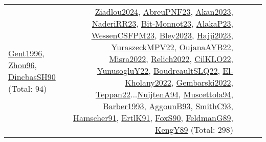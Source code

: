 {\begin{longtable}{p{3cm}r>{\raggedright\arraybackslash}p{6cm}>{\raggedright\arraybackslash}p{6cm}>{\raggedright\arraybackslash}p{8cm}}
\hyperref[detail:Gent1996]{Gent1996}, \hyperref[detail:Zhou96]{Zhou96}, \hyperref[detail:DincbasSH90]{DincbasSH90} (Total: 94) & \hyperref[detail:Ziadlou2024]{Ziadlou2024}, \hyperref[detail:AbreuPNF23]{AbreuPNF23}, \hyperref[detail:Akan2023]{Akan2023}, \hyperref[detail:NaderiRR23]{NaderiRR23}, \hyperref[detail:Bit-Monnot23]{Bit-Monnot23}, \hyperref[detail:AlakaP23]{AlakaP23}, \hyperref[detail:WessenCSFPM23]{WessenCSFPM23}, \hyperref[detail:Bley2023]{Bley2023}, \hyperref[detail:Hajji2023]{Hajji2023}, \hyperref[detail:YuraszeckMPV22]{YuraszeckMPV22}, \hyperref[detail:OujanaAYB22]{OujanaAYB22}, \hyperref[detail:Misra2022]{Misra2022}, \hyperref[detail:Relich2022]{Relich2022}, \hyperref[detail:CilKLO22]{CilKLO22}, \hyperref[detail:YunusogluY22]{YunusogluY22}, \hyperref[detail:BoudreaultSLQ22]{BoudreaultSLQ22}, \hyperref[detail:El-Kholany2022]{El-Kholany2022}, \hyperref[detail:Gembarski2022]{Gembarski2022}, \hyperref[detail:Teppan22]{Teppan22}...\hyperref[detail:NuijtenA94]{NuijtenA94}, \hyperref[detail:Muscettola94]{Muscettola94}, \hyperref[detail:Barber1993]{Barber1993}, \hyperref[detail:AggounB93]{AggounB93}, \hyperref[detail:SmithC93]{SmithC93}, \hyperref[detail:Hamscher91]{Hamscher91}, \hyperref[detail:ErtlK91]{ErtlK91}, \hyperref[detail:FoxS90]{FoxS90}, \hyperref[detail:FeldmanG89]{FeldmanG89}, \hyperref[detail:KengY89]{KengY89} (Total: 298)\\

\end{longtable}}
